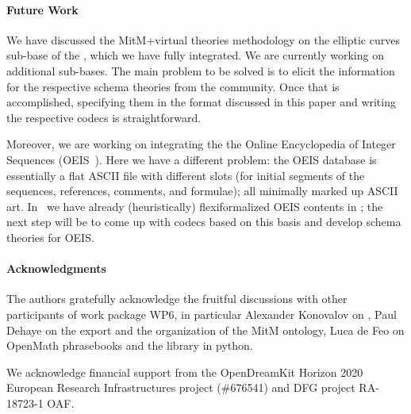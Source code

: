 \paragraph{Future Work}
We have discussed the MitM+virtual theories methodology on the elliptic curves sub-base of the \lmfdb, which we have fully integrated. 
We are currently working on additional \lmfdb sub-bases. 
The main problem to be solved is to elicit the information for the respective schema theories from the \lmfdb community. 
Once that is accomplished, specifying them in the format discussed in this paper and writing the respective codecs is straightforward. 

Moreover, we are working on integrating the the Online Encyclopedia of Integer Sequences (OEIS~\cite{Sloane:OEIS,oeis}). 
Here we have a different problem: the OEIS database is essentially a flat ASCII file with different slots (for initial segments of the sequences, references, comments, and formulae); all minimally marked up ASCII art. 
In~\cite{LuzKoh:fsarfo16} we have already (heuristically) flexiformalized OEIS contents in \ommt; the next step will be to come up with codecs based on this basis and develop schema theories for OEIS.


\paragraph*{Acknowledgments}
The authors gratefully acknowledge the fruitful discussions with other participants of
work package WP6, in particular Alexander Konovalov on \SCSCP, Paul Dehaye on the \Sage
export and the organization of the MitM ontology, Luca de Feo on OpenMath phrasebooks
and the \SCSCP library in python.

We acknowledge financial support from the OpenDreamKit Horizon 2020 European Research
Infrastructures project (\#676541) and DFG project RA-18723-1 OAF.


